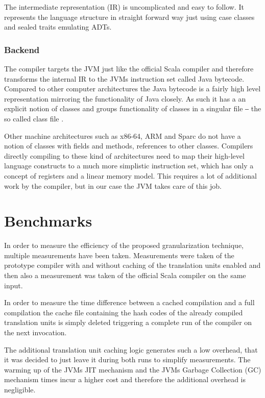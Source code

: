 \documentclass{VUMIFPSbakalaurinis}
\begin{document}
The intermediate representation (IR) is uncomplicated and easy to follow.
It represents the language structure in straight forward way just using case classes and sealed traits emulating ADTs.

%

\subsubsection{Backend}

The compiler targets the JVM just like the official Scala compiler and therefore transforms the internal IR to the JVMs instruction set called Java bytecode.
Compared to other computer architectures the Java bytecode is a fairly high level representation mirroring the functionality of Java closely.
As such it has a an explicit notion of classes and groups functionality of classes in a singular file ‒ the so called class file \cite{ClassFileFormat}.

Other machine architectures such as x86-64, ARM and Sparc do not have a notion of classes with fields and methods, references to other classes.
Compilers directly compiling to these kind of architectures need to map their high-level language constructs to a much more simplistic instruction set, which has only a concept of registers and a linear memory model.
This requires a lot of additional work by the compiler, but in our case the JVM takes care of this job.

\section{Benchmarks}
In order to measure the efficiency of the proposed granularization technique, multiple measurements have been taken.
Measurements were taken of the prototype compiler with and without caching of the translation units enabled and then also a measurement was taken of the official Scala compiler on the same input.

In order to measure the time difference between a cached compilation and a full compilation the cache file containing the hash codes of the already compiled translation units is simply deleted triggering a complete run of the compiler on the next invocation.

The additional translation unit caching logic generates such a low overhead, that it was decided to just leave it during both runs to simplify measurements.
The warming up of the JVMs JIT mechanism and the JVMs Garbage Collection (GC) mechanism times incur a higher cost and therefore the additional overhead is negligible.
\end{document}
